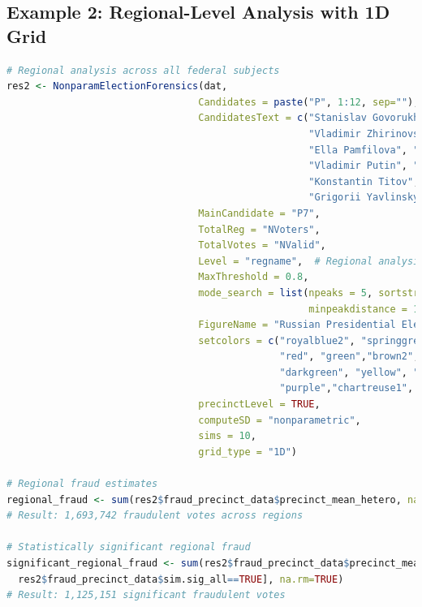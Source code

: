 \documentclass{article}
\begin{document}
\subsection{Example 2: Regional-Level Analysis with 1D Grid}
\begin{lstlisting}[language=R]
# Regional analysis across all federal subjects
res2 <- NonparamElectionForensics(dat, 
                                 Candidates = paste("P", 1:12, sep=""),
                                 CandidatesText = c("Stanislav Govorukhin", "Umar Dzhabrailov",  
                                                    "Vladimir Zhirinovsky", "Gennady Zuganov", 
                                                    "Ella Pamfilova", "Alexei Podberezkin", 
                                                    "Vladimir Putin", "Yuri Skuratov",
                                                    "Konstantin Titov", "Aman Tuleev",
                                                    "Grigorii Yavlinsky", "Against All"),
                                 MainCandidate = "P7",
                                 TotalReg = "NVoters",
                                 TotalVotes = "NValid",
                                 Level = "regname",  # Regional analysis
                                 MaxThreshold = 0.8,
                                 mode_search = list(npeaks = 5, sortstr = TRUE,
                                                    minpeakdistance = 1, pick_by = "height"),
                                 FigureName = "Russian Presidential Elections, 2000",
                                 setcolors = c("royalblue2", "springgreen1","blue", 
                                               "red", "green","brown2",
                                               "darkgreen", "yellow", "lawngreen", 
                                               "purple","chartreuse1", "orange"),
                                 precinctLevel = TRUE, 
                                 computeSD = "nonparametric",
                                 sims = 10, 
                                 grid_type = "1D")

# Regional fraud estimates
regional_fraud <- sum(res2$fraud_precinct_data$precinct_mean_hetero, na.rm=TRUE)
# Result: 1,693,742 fraudulent votes across regions

# Statistically significant regional fraud
significant_regional_fraud <- sum(res2$fraud_precinct_data$precinct_mean_hetero[
  res2$fraud_precinct_data$sim.sig_all==TRUE], na.rm=TRUE)
# Result: 1,125,151 significant fraudulent votes
\end{lstlisting}
\end{document}
